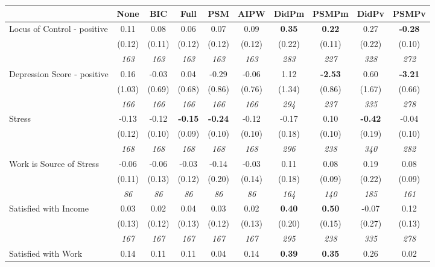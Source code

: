 \begin{tabular}{l c c c c c c c c c}
\toprule
 & None & BIC & Full & PSM & AIPW & DidPm & PSMPm & DidPv & PSMPv \\
\midrule
Locus of Control - positive & 0.11 & 0.08 & 0.06 & 0.07 & 0.09 & \textbf{ 0.35 } & \textbf{0.22} & 0.27 & \textbf{-0.28} \\
& (0.12) & (0.11) & (0.12) & (0.12) & (0.12) & (0.22) & (0.11) & (0.22) & (0.10) \\
& \textit{ 163 } & \textit{ 163 } & \textit{ 163 } & \textit{ 163 } & \textit{ 163 } & \textit{ 283 } & \textit{ 227 } & \textit{ 328 } & \textit{ 272 } \\
Depression Score - positive & 0.16 & -0.03 & 0.04 & -0.29 & -0.06 & 1.12 & \textbf{-2.53} & 0.60 & \textbf{-3.21} \\
& (1.03) & (0.69) & (0.68) & (0.86) & (0.76) & (1.34) & (0.86) & (1.67) & (0.66) \\
& \textit{ 166 } & \textit{ 166 } & \textit{ 166 } & \textit{ 166 } & \textit{ 166 } & \textit{ 294 } & \textit{ 237 } & \textit{ 335 } & \textit{ 278 } \\
Stress & -0.13 & -0.12 & \textbf{ -0.15 } & \textbf{-0.24} & -0.12 & -0.17 & 0.10 & \textbf{ -0.42 } & -0.04 \\
& (0.12) & (0.10) & (0.09) & (0.10) & (0.10) & (0.18) & (0.10) & (0.19) & (0.10) \\
& \textit{ 168 } & \textit{ 168 } & \textit{ 168 } & \textit{ 168 } & \textit{ 168 } & \textit{ 296 } & \textit{ 238 } & \textit{ 340 } & \textit{ 282 } \\
Work is Source of Stress & -0.06 & -0.06 & -0.03 & -0.14 & -0.03 & 0.11 & 0.08 & 0.19 & 0.08 \\
& (0.11) & (0.13) & (0.12) & (0.20) & (0.14) & (0.18) & (0.09) & (0.22) & (0.09) \\
& \textit{ 86 } & \textit{ 86 } & \textit{ 86 } & \textit{ 86 } & \textit{ 86 } & \textit{ 164 } & \textit{ 140 } & \textit{ 185 } & \textit{ 161 } \\
Satisfied with Income & 0.03 & 0.02 & 0.04 & 0.03 & 0.02 & \textbf{ 0.40 } & \textbf{0.50} & -0.07 & 0.12 \\
& (0.13) & (0.12) & (0.13) & (0.12) & (0.13) & (0.20) & (0.15) & (0.27) & (0.13) \\
& \textit{ 167 } & \textit{ 167 } & \textit{ 167 } & \textit{ 167 } & \textit{ 167 } & \textit{ 295 } & \textit{ 238 } & \textit{ 335 } & \textit{ 278 } \\
Satisfied with Work & 0.14 & 0.11 & 0.11 & 0.04 & 0.14 & \textbf{ 0.39 } & \textbf{0.35} & 0.26 & 0.02 \\

\end{tabular}
